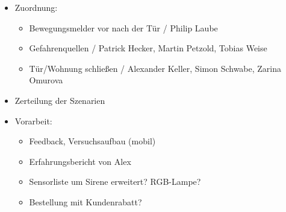 \begin{itemize}
\begin{itemize}
	\end{itemize}
	\item Zuordnung:
	\begin{itemize}
		\item Bewegungsmelder vor nach der Tür / Philip Laube
		\item Gefahrenquellen / Patrick Hecker, Martin Petzold, Tobias Weise
		\item Tür/Wohnung schließen / Alexander Keller, Simon Schwabe, Zarina Omurova
	\end{itemize}
	\item Zerteilung der Szenarien
	\item Vorarbeit:
	\begin{itemize}
		\item Feedback, Versuchsaufbau (mobil)
		\item Erfahrungsbericht von Alex
		\item Sensorliste um Sirene erweitert? RGB-Lampe?
		\item Bestellung mit Kundenrabatt?
	\end{itemize}
\end{itemize}

